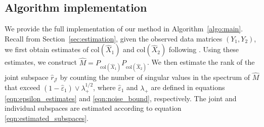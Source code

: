 \documentclass{amsart}
\begin{document}




\subsection{Algorithm implementation}
\label{sec:algo-appendix}
We provide the full implementation of our method in Algorithm~\ref{algo:main}. Recall from Section~\ref{sec:estimation}, given the observed data matrices \( (Y_1, Y_2) \), we first obtain estimates of \( \text{col}(\widehat{X}_1) \) and \( \text{col}(\widehat{X}_2) \) following \citet{gavish2014optimal}. Using these estimates, we construct \( \widehat{M} = P_{\text{col}(\widehat{X}_1)} P_{\text{col}(\widehat{X}_2)} \). We then estimate the rank of the joint subspace \( \widehat{r}_{\mathcal{J}} \) by counting the number of singular values in the spectrum of \( \widehat{M} \) that exceed \( (1 - \widehat{\varepsilon}_1) \vee \lambda_{+}^{1/2} \), where \( \widehat{\varepsilon}_1 \) and \( \lambda_{+} \) are defined in equations \eqref{eqn:epsilon_estimates} and \eqref{eqn:noise_bound}, respectively. The joint and individual subspaces are estimated according to equation \eqref{eqn:estimated_subspaces}.
\end{document}
